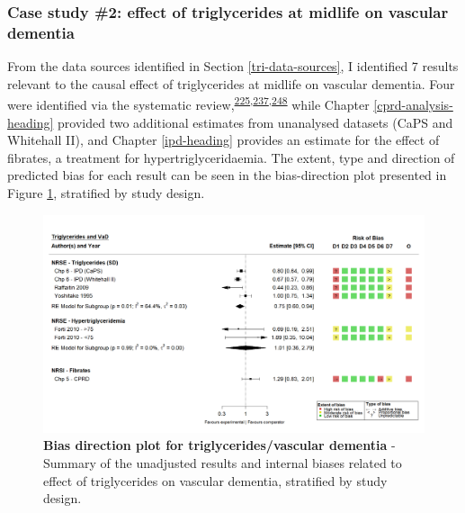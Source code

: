 \documentclass[a4paper, twoside]{templates/ociamthesis}
\begin{document}
\hypertarget{case-study-2-effect-of-triglycerides-at-midlife-on-vascular-dementia}{%
\subsubsection{Case study \#2: effect of triglycerides at midlife on vascular dementia}\label{case-study-2-effect-of-triglycerides-at-midlife-on-vascular-dementia}}

From the data sources identified in Section \ref{tri-data-sources}, I identified 7 results relevant to the causal effect of triglycerides at midlife on vascular dementia. Four were identified via the systematic review,\textsuperscript{\protect\hyperlink{ref-forti2010}{225},\protect\hyperlink{ref-raffaitin2009}{237},\protect\hyperlink{ref-yoshitake1995}{248}} while Chapter \ref{cprd-analysis-heading} provided two additional estimates from unanalysed datasets (CaPS and Whitehall II), and Chapter \ref{ipd-heading} provides an estimate for the effect of fibrates, a treatment for hypertriglyceridaemia. The extent, type and direction of predicted bias for each result can be seen in the bias-direction plot presented in Figure \ref{fig:tgVadBiasDirection}, stratified by study design.





\begin{figure}[H]
\includegraphics[width=1\linewidth]{figures/tri/midlife_VaD} \caption[Bias direction plot for triglycerides/vascular dementia]{\textbf{Bias direction plot for triglycerides/vascular dementia} - Summary of the unadjusted results and internal biases related to effect of triglycerides on vascular dementia, stratified by study design.}\label{fig:tgVadBiasDirection}
\end{figure}
\end{document}
